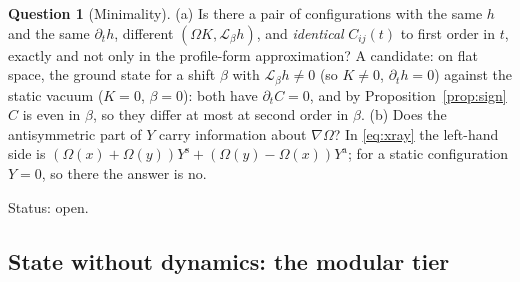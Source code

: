 \documentclass[a4paper,11pt]{article}
\theoremstyle{definition}
\newtheorem{question}[theorem]{Question}
\theoremstyle{remark}
\newcommand{\Lie}{\mathcal{L}}
\newcommand{\status}[1]{\par\noindent\textsf{\small Status: #1}\par}
\begin{document}
\begin{question}[Minimality]\label{q:minimal}
\textup{(a)} Is there a pair of configurations with the same $h$ and the same $\partial_th$, different $(\Omega K,\Lie_\beta h)$, and \emph{identical} $C_{ij}(t)$ to first order in $t$, exactly and not only in the profile-form approximation? A candidate: on flat space, the ground state for a shift $\beta$ with $\Lie_\beta h\ne0$ (so $K\ne0$, $\partial_th=0$) against the static vacuum ($K=0$, $\beta=0$): both have $\partial_tC=0$, and by Proposition~\ref{prop:sign} $C$ is even in $\beta$, so they differ at most at second order in $\beta$.
\textup{(b)} Does the antisymmetric part of $Y$ carry information about $\nabla\Omega$? In \eqref{eq:xray} the left-hand side is $(\Omega(x)+\Omega(y))Y^{\mathrm s}+(\Omega(y)-\Omega(x))Y^{\mathrm a}$; for a static configuration $Y=0$, so there the answer is no.
\end{question}
\status{open.}

\subsection{State without dynamics: the modular tier}
\end{document}

